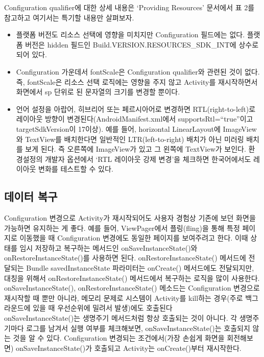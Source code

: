 Configuration qualifier에 대한 상세 내용은 `Providing Resources' 문서에서 표 2를 참고하고 여기서는 특기할 내용만 살펴보자.
\begin{itemize}
\item 플랫폼 버전도 리소스 선택에 영향을 미치지만  Configuration 필드에는 없다. 플랫폼 버전은 hidden 필드인 Build.VERSION.RESOURCES\_SDK\_INT에 상수로 되어 있다. 
\item Configuration 가운데서 fontScale은 Configuration qualifier와 관련된 것이 없다. 즉, fontScale은 리소스 선택 로직에는 영향을 주지 않고 Activity를 재시작하면서 화면에서 sp 단위로 된 문자열의 크기를 변경할 뿐이다.
\item 언어 설정을 아랍어, 히브리어 또는 페르시아어로 변경하면 RTL(right-to-left)로 레이아웃 방향이 변경된다(AndroidManifest.xml에서 supportsRtl=``true''이고 targetSdkVersion이 17이상). 예를 들어, horizontal LinearLayout에 ImageView와 TextView를 배치한다면 일반적인 LTR(left-to-right) 배치가 아닌 미러링 배치를 보게 된다. 즉 오른쪽에 ImageView가 있고 그 왼쪽에 TextView가 보인다. 환경설정의 개발자 옵션에서 `RTL 레이아웃 강제 변경'을 체크하면 한국어에서도 레이아웃 변화를 테스트할 수 있다. 
\end{itemize}

\subsection{데이터 복구}
Configuration 변경으로 Activity가 재시작되어도 사용자 경험상 기존에 보던 화면을 가능하면 유지하는 게 좋다. 예를 들어, ViewPager에서 플링(fling)을 통해 특정 페이지로 이동했을 때 Configuration 변경에도 동일한 페이지를 보여주려고 한다. 이때 상태를 임시 저장하고 복구하는 메서드인 onSaveInstanceState()와 onRestoreInstanceState()를 사용하면 된다. onRestoreInstanceState() 메서드에 전달되는 Bundle savedInstanceState 파라미터는 onCreate() 메서드에도 전달되지만, 대칭을 위해서 onRestoreInstanceState() 메서드에서 복구하는 로직을 많이 사용한다.
onSaveInstanceState(), onRestoreInstanceState() 메소드는 Configuration 변경으로 재시작할 때 뿐만 아니라, 메모리 문제로 시스템이 Activity를 kill하는 경우(주로 백그라운드에 있을 때 우선순위에 밀려서 발생)에도 호출된다\\

onSaveInstanceState()는 생명주기 메서드처럼 항상 호출되는 것이 아니다.
각 생명주기마다 로그를 남겨서 실행 여부를 체크해보면, onSaveInstanceState()는 호출되지 않는 것을 알 수 있다. 
Configuration 변경되는 조건에서(가장 손쉽게 화면을 회전해보면) onSaveInstanceState()가 호출되고 Activity는 onCreate()부터 재시작한다.\\

